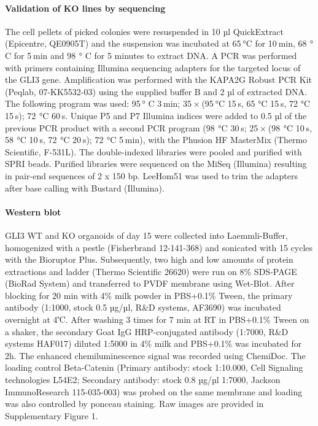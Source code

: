 \paragraph{Validation of KO lines by sequencing}
The cell pellets of picked colonies were resuspended in 10 µl QuickExtract (Epicentre, QE0905T) and the suspension was incubated at 65 °C for 10 min, 68  ° C for 5 min and 98  ° C for 5 minutes to extract DNA. A PCR was performed with primers containing Illumina sequencing adapters for the targeted locus of the GLI3 gene. Amplification was performed with the KAPA2G Robust PCR Kit (Peqlab, 07-KK5532-03) using the supplied buffer B and 2 µl of extracted DNA. The following program was used: 95 ° C 3 min; 35 × (95 °C 15 s, 65 °C 15 s, 72  °C 15 s); 72  °C 60 s. Unique P5 and P7 Illumina indices were added to 0.5 µl of the previous PCR product with a second PCR program (98  °C 30 s; 25 × (98  °C 10 s, 58  °C 10 s, 72  °C 20 s); 72  °C 5 min), with the Phusion HF MasterMix (Thermo Scientific, F-531L). The double-indexed libraries were pooled and purified with SPRI beads. Purified libraries were sequenced on the MiSeq (Illumina) resulting in pair-end sequences of 2 x 150 bp. LeeHom51 was used to trim the adapters after base calling with Bustard (Illumina).
 
\paragraph{Western blot}
GLI3 WT and KO organoids of day 15 were collected into Laemmli-Buffer, homogenized with a pestle (Fisherbrand 12-141-368) and sonicated with 15 cycles with the Bioruptor Plus. Subsequently, two high and low amounts of protein extractions and ladder (Thermo Scientific 26620) were run on 8\% SDS-PAGE (BioRad System) and transferred to PVDF membrane using Wet-Blot. After blocking for 20 min with 4\% milk powder in PBS+0.1\% Tween, the primary antibody (1:1000, stock 0.5 µg/µl,  R\&D systems, AF3690) was incubated overnight at 4℃. After washing 3 times for 7 min at RT in PBS+0.1\% Tween on a shaker, the secondary Goat IgG HRP-conjugated antibody (1:7000, R\&D systems HAF017) diluted 1:5000 in 4\% milk and PBS+0.1\%  was incubated for 2h. The enhanced chemiluminescence signal was recorded using ChemiDoc. The loading control Beta-Catenin (Primary antibody: stock 1:10.000, Cell Signaling technologies L54E2; Secondary antibody: stock 0.8 µg/µl 1:7000, Jackson ImmunoResearch 115-035-003) was probed on the same membrane and loading was also controlled by ponceau staining. Raw images are provided in Supplementary Figure 1.
 
